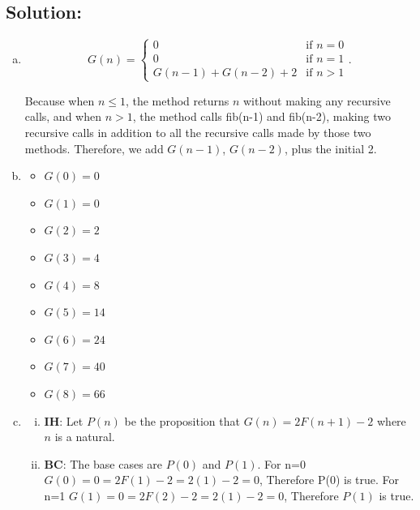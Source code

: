 \documentclass[12pt]{article}
\begin{document}
	\subsection*{\textbf{Solution:}}
	\begin{enumerate}[(a)]
		\item
			\begin{equation}
				G(n) =
				\begin{cases}
					0                       & \mbox{if $n=0$} \\
					0                       & \mbox{if $n=1$} \\
					G(n - 1) + G(n - 2) + 2 & \mbox{if $n>1$}
				\end{cases}.
			\end{equation}

			Because when $n\leq 1$, the method returns $n$ without making any recursive
			calls, and when $n>1$, the method calls fib(n-1) and fib(n-2), making two
			recursive calls in addition to all the recursive calls made by those two
			methods. Therefore, we add $G(n-1)$, $G(n-2)$, plus the initial 2.

		\item
			\begin{itemize}
				\item $G(0)=0$

				\item $G(1)=0$

				\item $G(2)=2$

				\item $G(3)=4$

				\item $G(4)=8$

				\item $G(5)=14$

				\item $G(6)=24$

				\item $G(7)=40$

				\item $G(8)=66$
			\end{itemize}

		\item
			\begin{enumerate}[(i)]
				\item \textbf{IH}: Let $P(n)$ be the proposition that $G(n)=2F(n+1)-2$ where
					$n$ is a natural.

				\item \textbf{BC}: The base cases are $P(0)$ and $P(1)$. For n=0
					$G(0)=0=2F(1)-2=2(1)-2=0$, Therefore P(0) is true. For n=1 $G(1)=0=2F(2
					)-2=2(1)-2=0$, Therefore $P(1)$ is true.


\end{enumerate}
\end{enumerate}
\end{document}
